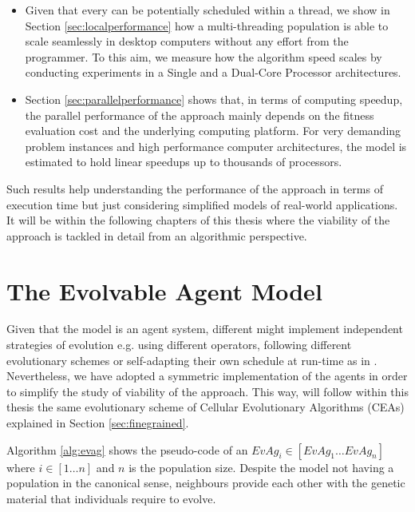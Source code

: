 \begin{itemize}
\item Given that every \evag can be potentially scheduled within a thread, we show in Section \ref{sec:localperformance} how a multi-threading population is able to scale seamlessly in desktop computers without any effort from the programmer. To this aim, we measure how the algorithm speed scales by conducting experiments in a Single and a Dual-Core Processor architectures.
\item Section \ref{sec:parallelperformance} shows that, in terms of computing speedup, the parallel performance of the approach mainly depends on the fitness evaluation cost and the underlying computing platform. For very demanding problem instances and high performance computer architectures, the \evag model is estimated to hold linear speedups up to thousands of processors.
\end{itemize}



Such results help understanding the performance of the approach in terms of execution time but just considering simplified models of real-world applications. It will be within the following chapters of this thesis where the viability of the approach is tackled in detail from an algorithmic perspective. %


\section{The Evolvable Agent Model}
\label{sec:evag}

Given that the \evag model is an agent system, different \evags might implement independent strategies of evolution e.g. using different operators, following different evolutionary schemes or self-adapting their own schedule at run-time as in \cite{upali:adaptive}. Nevertheless, we have adopted a symmetric implementation of the agents in order to simplify the study of viability of the approach. This way, \evags will follow within this thesis the same evolutionary scheme of Cellular Evolutionary Algorithms (CEAs) explained in Section \ref{sec:finegrained}.


Algorithm \ref{alg:evag} shows the pseudo-code of an $EvAg_i \in [EvAg_1\dots EvAg_n]$ where $i \in [1\dots n]$ and $n$ is the population size. Despite the model not having a population in the canonical sense, neighbours \evags provide each other with the genetic material that individuals require to evolve. 

